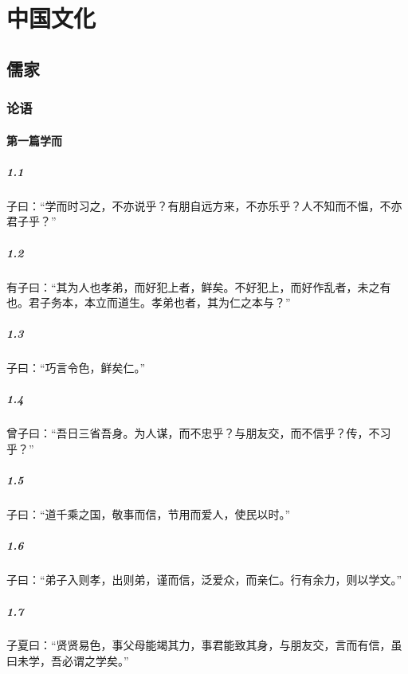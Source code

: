 \documentclass[main.tex]{subfiles}
\begin{document}
\chapter{中国文化}

\section{儒家}

\subsection{论语}

\subsubsection{第一篇学而}
\paragraph{1.1}
子曰：“学而时习之，不亦说乎？有朋自远方来，不亦乐乎？人不知而不愠，不亦君子乎？”

\paragraph{1.2}
有子曰：“其为人也孝弟，而好犯上者，鲜矣。不好犯上，而好作乱者，未之有也。君子务本，本立而道生。孝弟也者，其为仁之本与？”

\paragraph{1.3}
子曰：“巧言令色，鲜矣仁。”

\paragraph{1.4}
曾子曰：“吾日三省吾身。为人谋，而不忠乎？与朋友交，而不信乎？传，不习乎？”

\paragraph{1.5}
子曰：“道千乘之国，敬事而信，节用而爱人，使民以时。”

\paragraph{1.6}
子曰：“弟子入则孝，出则弟，谨而信，泛爱众，而亲仁。行有余力，则以学文。”

\paragraph{1.7}
子夏曰：“贤贤易色，事父母能竭其力，事君能致其身，与朋友交，言而有信，虽曰未学，吾必谓之学矣。”
\end{document}
